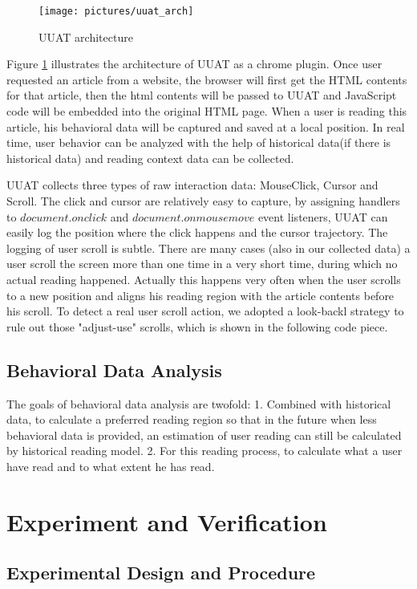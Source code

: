 \documentclass{sigchi}
\begin{document}
\begin{figure}[!h]
\centering
\texttt{[image: pictures/uuat\_arch]}
\caption{UUAT architecture}
\label{fig:uuat-arch}
\end{figure}

Figure \ref{fig:uuat-arch} illustrates the architecture of UUAT as a chrome plugin. Once user requested an article from a website, the
browser will first get the HTML contents for that article, then the html contents will be passed to UUAT and JavaScript code will be embedded into the original 
HTML page. When a user is reading this article, his behavioral data will be captured and saved at a local position. In real time, user behavior can be 
analyzed with the help of historical data(if there is historical data) and reading context data can be collected. 

UUAT collects three types of raw interaction data: MouseClick, Cursor and Scroll. The click and cursor are relatively easy to capture, by assigning handlers to $document.onclick$ and
$document.onmousemove$ event listeners, UUAT can easily log the position where the click happens and the cursor trajectory. The logging of user scroll is subtle. There are many 
cases (also in our collected data) a user scroll the screen more than one time in a very short time, during which no actual reading happened. 
Actually this happens very often when the user scrolls to a new position and aligns his reading region with the article contents before his scroll. 
To detect a real user scroll action, we adopted a look-backl strategy to rule out those "adjust-use" scrolls, which is shown in the following code piece.








\subsection{Behavioral Data Analysis} 
The goals of behavioral data analysis are twofold: 1. Combined with historical data, 
to calculate a preferred reading region so that  in the future when less behavioral data 
is provided, an estimation of user reading can still be calculated by historical reading 
model. 2. For this reading process, to calculate what a user have read and to what extent he has read. 


\section{Experiment and Verification}




\subsection{Experimental Design and Procedure}




 






\end{document}
